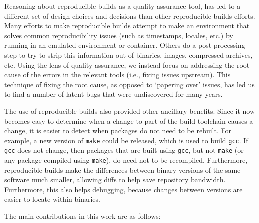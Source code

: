 Reasoning about reproducible builds as a quality assurance tool, has led to
a different set of design choices and decisions than other reproducible
builds efforts.  Many efforts to make reproducible builds attempt to make
an environment that solves common reproducibility issues (such as
timestamps, locales, etc.) by running in an emulated environment or
container.   Others do a post-processing step to try to strip this
information out of binaries, images, compressed archives, etc.  Using the
lens of quality assurance, we instead focus on addressing the root cause of
the errors in the relevant tools (i.e., fixing issues upstream).  This
technique of fixing the root cause, as opposed to `papering over' issues,
has led us to find a number of latent bugs that were undiscovered for many
years. 

The use of reproducible builds also provided other ancillary benefits.  Since
it now becomes easy to determine when a change to part of the build toolchain
causes a change, it is easier to detect when packages do not need to be 
rebuilt.  For example, a new version of {\tt make} could be released, which
is used to build {\tt gcc}.  If {\tt gcc} does not change, then packages
that are built using {\tt gcc}, but not {\tt make} (or any package compiled
using {\tt make}), do need not to be recompiled.
Furthermore, reproducible builds make the differences between
binary versions of the same software much smaller, allowing diffs to help
save repository bandwidth.  Furthermore, this also helps debugging, because
changes between versions are easier to locate within binaries.

The main contributions in this work are as follows:

